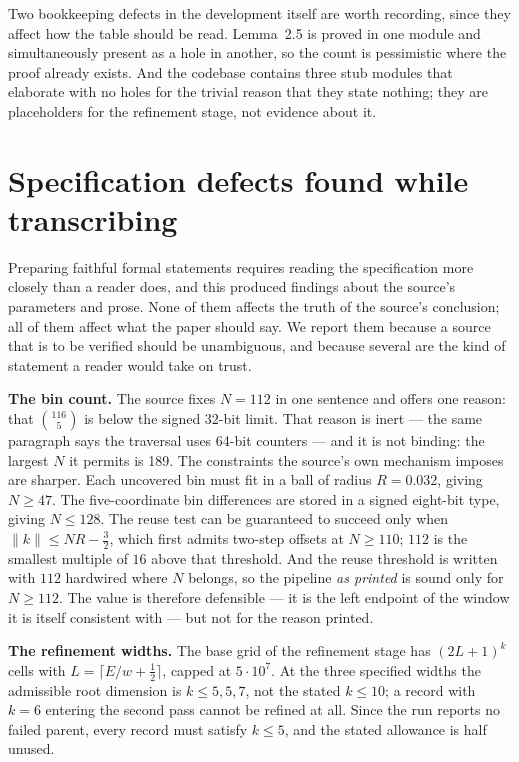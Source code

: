 \documentclass[11pt]{article}
\theoremstyle{definition}
\newcommand{\norm}[1]{\lVert #1\rVert}
\begin{document}
Two bookkeeping defects in the development itself are worth recording, since they affect how the
table should be read. Lemma~2.5 is proved in one module and simultaneously present as a hole in
another, so the count is pessimistic where the proof already exists. And the codebase contains
three stub modules that elaborate with no holes for the trivial reason that they state nothing;
they are placeholders for the refinement stage, not evidence about it.

\section{Specification defects found while transcribing}
\label{sec:spec}

Preparing faithful formal statements requires reading the specification more closely than a reader
does, and this produced findings about the source's parameters and prose. None of them affects the
truth of the source's conclusion; all of them affect what the paper should say. We report them
because a source that is to be verified should be unambiguous, and because several are the kind of
statement a reader would take on trust.

\textbf{The bin count.} The source fixes $N=112$ in one sentence and offers one reason: that
$\binom{116}{5}$ is below the signed 32-bit limit. That reason is inert --- the same paragraph says
the traversal uses 64-bit counters --- and it is not binding: the largest $N$ it permits is 189. The
constraints the source's own mechanism imposes are sharper. Each uncovered bin must fit in a ball
of radius $R=0.032$, giving $N\ge 47$. The five-coordinate bin differences are stored in a signed
eight-bit type, giving $N\le 128$. The reuse test can be guaranteed to succeed only when
$\norm k\le NR-\tfrac32$, which first admits two-step offsets at $N\ge110$; $112$ is the smallest
multiple of $16$ above that threshold. And the reuse threshold is written with $112$ hardwired where
$N$ belongs, so the pipeline \emph{as printed} is sound only for $N\ge112$. The value is therefore
defensible --- it is the left endpoint of the window it is itself consistent with --- but not for
the reason printed.

\textbf{The refinement widths.} The base grid of the refinement stage has $(2L+1)^k$ cells with
$L=\lceil E/w+\tfrac12\rceil$, capped at $5\cdot10^7$. At the three specified widths the admissible
root dimension is $k\le5,5,7$, not the stated $k\le10$; a record with $k=6$ entering the second
pass cannot be refined at all. Since the run reports no failed parent, every record must satisfy
$k\le5$, and the stated allowance is half unused.
\end{document}
